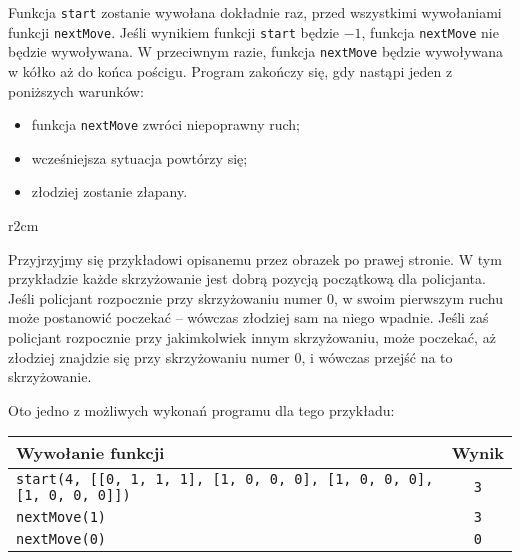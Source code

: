 \documentclass{boi2014-pl}
\renewcommand{\method}[1]{{\tt #1}}
\newcommand{\constant}[1]{{\tt #1}}
\begin{document}
    Funkcja \method{start} zostanie wywołana dokładnie raz,
    przed wszystkimi wywołaniami funkcji \method{nextMove}.
    Jeśli wynikiem funkcji \method{start} będzie $-1$,
    funkcja \method{nextMove} nie będzie wywoływana.
    W przeciwnym razie, funkcja \method{nextMove} będzie wywoływana w kółko
    aż do końca pościgu.
    Program zakończy się, gdy nastąpi jeden z poniższych warunków:
    \begin{itemize}
        \item funkcja \method{nextMove} zwróci niepoprawny ruch;
        \item wcześniejsza sytuacja powtórzy się;
        \item złodziej zostanie złapany.
    \end{itemize}

    \Example
    \begin{wrapfigure}[4]{r}{2cm}
        \vspace{-0.5cm}
        \centering
    \end{wrapfigure}
    Przyjrzyjmy się przykładowi opisanemu przez obrazek po prawej stronie.
    W tym przykładzie każde skrzyżowanie jest dobrą pozycją początkową dla policjanta.
    Jeśli policjant rozpocznie przy skrzyżowaniu numer 0, w swoim pierwszym ruchu
    może postanowić poczekać -- wówczas złodziej sam na niego wpadnie.
    Jeśli zaś policjant rozpocznie przy jakimkolwiek innym skrzyżowaniu, może poczekać,
    aż złodziej znajdzie się przy skrzyżowaniu numer 0, i wówczas przejść na to skrzyżowanie.
   
    Oto jedno z możliwych wykonań programu dla tego przykładu:

    \begin{tabular}{|l|c|}
        \hline
            {\bf Wywołanie funkcji} & {\bf Wynik} \\
        \hline
            \method{start(4, [[0, 1, 1, 1], [1, 0, 0, 0], [1, 0, 0, 0], [1, 0, 0, 0]])} &
            \constant{3} \\
        \hline
            \method{nextMove(1)} & \constant{3} \\
        \hline
            \method{nextMove(0)} & \constant{0} \\
        \hline
    \end{tabular}
\end{document}
